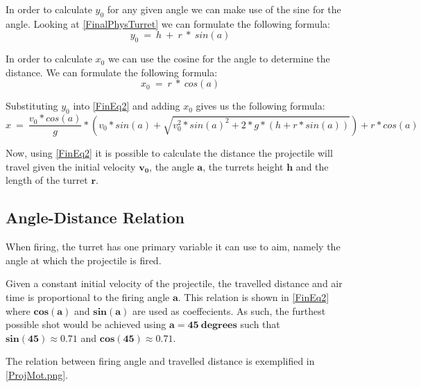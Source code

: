 In order to calculate $y_0$ for any given angle we can make use of the sine for
the angle. Looking at \autoref{FinalPhysTurret} we can formulate the following
formula:
\begin{equation}\label{Y0Eq}
y_0\ =\ h\ +\ r\ *\ sin(a)
\end{equation}\nl

In order to calculate $x_0$ we can use the cosine for the angle to determine the
distance. We can formulate the following formula:
\begin{equation}\label{Y0Eq}
x_0\ =\ r\ *\ cos(a)
\end{equation}

Substituting $y_0$ into \autoref{FinEq2} and adding $x_0$ gives
us the following formula:
\begin{equation}\label{FinEq3}
x\ =\ \frac{v_0*cos(a)}{g}* \left(
v_0*sin(a)+\sqrt{v_0^2*sin(a)^2+2*g*(h+r*sin(a))}\right)+r*cos(a)
\end{equation}

Now, using \autoref{FinEq2} it is possible to calculate the
distance the projectile will travel given the initial velocity $\mathbf{v_0}$,
the angle $\mathbf{a}$, the turrets height $\mathbf{h}$ and the length of the
turret $\mathbf{r}$.

\subsection{Angle-Distance Relation}
When firing, the turret has one primary variable it can use to aim,
namely the angle at which the projectile is fired.


Given a constant initial velocity of the projectile, the travelled distance and
air time is proportional to the firing angle $\mathbf{a}$. This relation is
shown in \autoref{FinEq2} where $\mathbf{cos(a)}$ and $\mathbf{sin(a)}$ are used as
coeffecients. As such, the furthest possible shot would be achieved using
$\mathbf{a=45\ degrees}$ such that $\mathbf{sin(45)\approx 0.71}$ and
$\mathbf{cos(45)\approx 0.71}$.

The relation between firing angle and travelled distance is exemplified in
\autoref{ProjMot.png}.


